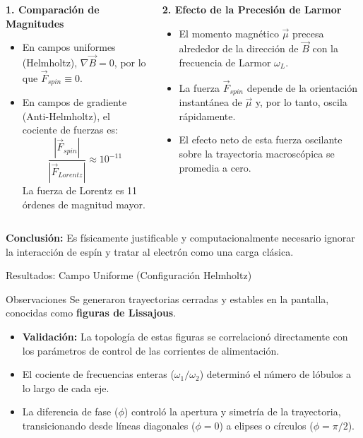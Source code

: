 \documentclass{beamer}
\begin{document}
\begin{frame}
  \begin{columns}[T]
    \begin{column}{0.5\textwidth}
      \textbf{1. Comparación de Magnitudes}
      \begin{itemize}
        \item En campos uniformes (Helmholtz), $\nabla \vec{B} = 0$, por lo que $\vec{F}_{spin} \equiv 0$.
        \item En campos de gradiente (Anti-Helmholtz), el cociente de fuerzas es:
          $$ \frac{|\vec{F}_{spin}|}{|\vec{F}_{Lorentz}|} \approx 10^{-11} $$
          La fuerza de Lorentz es 11 órdenes de magnitud mayor.
      \end{itemize}
    \end{column}
    \begin{column}{0.5\textwidth}
      \textbf{2. Efecto de la Precesión de Larmor}
      \begin{itemize}
        \item El momento magnético $\vec{\mu}$ precesa alrededor de la dirección de $\vec{B}$ con la frecuencia de Larmor $\omega_L$.
        \item La fuerza $\vec{F}_{spin}$ depende de la orientación instantánea de $\vec{\mu}$ y, por lo tanto, oscila rápidamente.
        \item El efecto neto de esta fuerza oscilante sobre la trayectoria macroscópica se promedia a cero.
      \end{itemize}
    \end{column}
  \end{columns}
  \textbf{Conclusión:} Es físicamente justificable y computacionalmente necesario ignorar la interacción de espín y tratar al electrón como una carga clásica.
\end{frame}

\begin{frame}{Resultados: Campo Uniforme (Configuración Helmholtz)}
  \begin{block}{Observaciones}
    Se generaron trayectorias cerradas y estables en la pantalla, conocidas como \textbf{figuras de Lissajous}.
  \end{block}

  \begin{itemize}
    \item \textbf{Validación:} La topología de estas figuras se correlacionó directamente con los parámetros de control de las corrientes de alimentación.
    \item El cociente de frecuencias enteras ($\omega_1 / \omega_2$) determinó el número de lóbulos a lo largo de cada eje.
    \item La diferencia de fase ($\phi$) controló la apertura y simetría de la trayectoria, transicionando desde líneas diagonales ($\phi=0$) a elipses o círculos ($\phi=\pi/2$).
  \end{itemize}
\end{frame}
\end{document}

